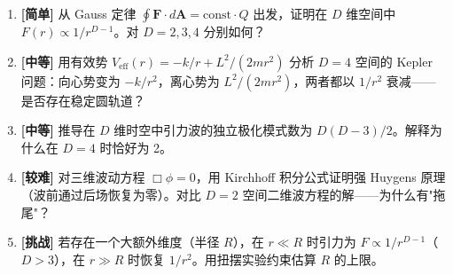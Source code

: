\begin{enumerate}
  \item \textbf{[简单]} 从 Gauss 定律 $\oint \mathbf{F}\cdot d\mathbf{A} = \text{const}\cdot Q$ 出发，证明在 $D$ 维空间中 $F(r) \propto 1/r^{D-1}$。对 $D=2,3,4$ 分别如何？
  \item \textbf{[中等]} 用有效势 $V_{\text{eff}}(r) = -k/r + L^2/(2mr^2)$ 分析 $D=4$ 空间的 Kepler 问题：向心势变为 $-k/r^2$，离心势为 $L^2/(2mr^2)$，两者都以 $1/r^2$ 衰减——是否存在稳定圆轨道？
  \item \textbf{[中等]} 推导在 $D$ 维时空中引力波的独立极化模式数为 $D(D-3)/2$。解释为什么在 $D=4$ 时恰好为 2。
  \item \textbf{[较难]} 对三维波动方程 $\Box\phi=0$，用 Kirchhoff 积分公式证明强 Huygens 原理（波前通过后场恢复为零）。对比 $D=2$ 空间二维波方程的解——为什么有"拖尾"？
  \item \textbf{[挑战]} 若存在一个大额外维度（半径 $R$），在 $r\ll R$ 时引力为 $F\propto 1/r^{D-1}$（$D>3$），在 $r\gg R$ 时恢复 $1/r^2$。用扭摆实验约束估算 $R$ 的上限。
\end{enumerate}
